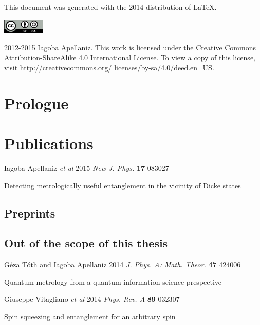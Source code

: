 \documentclass[12pt, letterpaper, twoside]{article}
\begin{document}
\pagestyle{fancy}
\renewcommand{\headrulewidth}{0pt}
\fancyhead{}
\fancyfoot{}

\begin{centering}

\end{centering}

\cleardoublepage

This document was generated with the 2014 distribution of \LaTeX. 

\vfill

\includegraphics[height=20pt]{img/0-CreativeCommons-by-sa.png}

2012-2015 Iagoba Apellaniz. This work is licensed under the Creative Commons
Attribution-ShareAlike 4.0 International License. To view a copy of this
license, visit
\href{http://creativecommons.org/licenses/by-sa/4.0/deed.en_US}
{http://creativecommons.org/ licenses/by-sa/4.0/deed.en\_US}.
\clearpage


\section*{Prologue}
\setcounter{page}{1}
\fancyfoot[LE,RO]{\thepage}



\section*{Publications}
{\setlength{\parindent}{0cm}
Iagoba Apellaniz \textit{et al} 2015 \textit{New J. Phys.} \textbf{17} 083027

Detecting metrologically useful entanglement in the vicinity of Dicke states

\subsection*{Preprints}
\subsection*{Out of the scope of this thesis}
G\'eza T\'oth and Iagoba Apellaniz 2014 \textit{J. Phys. A: Math. Theor.} \textbf{47} 424006

Quantum metrology from a quantum information science prespective
\vspace{10pt}

Giuseppe Vitagliano \textit{et al} 2014 \textit{Phys. Rev. A} \textbf{89} 032307

Spin squeezing and entanglement for an arbitrary spin
}
\end{document}
